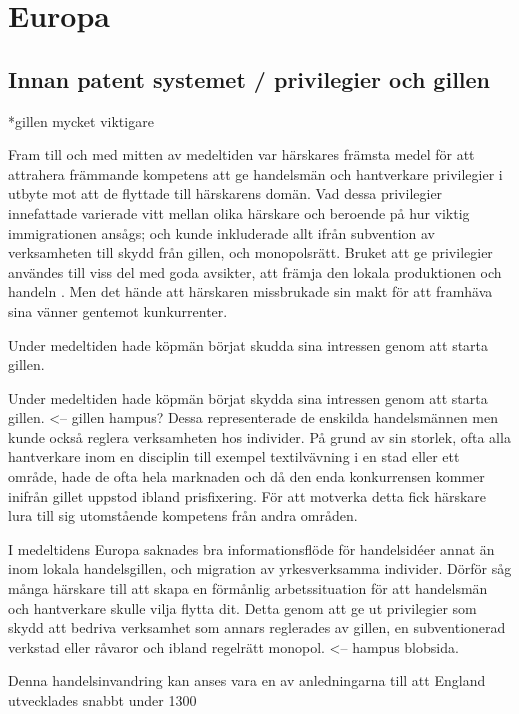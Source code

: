 \section{Europa}

\subsection{Innan patent systemet / privilegier och gillen} %
\label{sub:innan_patent_systemet}
*gillen mycket viktigare

Fram till och med mitten av medeltiden var härskares främsta medel för att
attrahera främmande kompetens att ge handelsmän och hantverkare privilegier i
utbyte mot att de flyttade till härskarens domän. 
Vad dessa privilegier innefattade varierade vitt mellan olika härskare och
beroende på hur viktig immigrationen ansågs; och kunde inkluderade allt ifrån
subvention av verksamheten till skydd från gillen, och monopolsrätt. 
Bruket att ge privilegier användes till viss del med goda avsikter, att främja
den lokala produktionen och handeln \cite{nard}. Men det hände att härskaren
missbrukade sin makt för att framhäva sina vänner gentemot kunkurrenter.

Under medeltiden hade köpmän börjat skudda sina intressen genom att starta
gillen.

Under medeltiden hade köpmän börjat skydda sina intressen genom att starta gillen. <-- gillen hampus?
Dessa representerade de enskilda handelsmännen men kunde också reglera verksamheten hos individer.
På grund av sin storlek, ofta alla hantverkare inom en disciplin till exempel textilvävning i en stad eller ett område, hade de ofta hela marknaden och då den enda konkurrensen kommer inifrån gillet uppstod ibland prisfixering. 
För att motverka detta fick härskare lura till sig utomstående kompetens från andra områden.

I medeltidens Europa saknades bra informationsflöde för handelsidéer annat än inom lokala handelsgillen, och migration av yrkesverksamma individer. 
Dörför såg många härskare till att skapa en förmånlig arbetssituation för att handelsmän och hantverkare skulle vilja flytta dit. 
Detta genom att ge ut privilegier som skydd att bedriva verksamhet som annars reglerades av gillen, en subventionerad verkstad eller råvaror och ibland regelrätt monopol. <-- hampus blobsida. 

Denna handelsinvandring kan anses vara en av anledningarna till att England utvecklades snabbt under 1300


